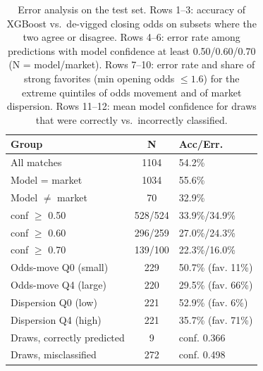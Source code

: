 \documentclass[10pt]{article}
\begin{document}
\begin{table}[htbp]
\centering
\caption{Error analysis on the test set. Rows 1--3: accuracy of XGBoost vs.\
de-vigged closing odds on subsets where the two agree or disagree. Rows 4--6:
error rate among predictions with model confidence at least 0.50/0.60/0.70
(N = model/market). Rows 7--10: error rate and share of strong favorites
(min opening odds $\le 1.6$) for the extreme quintiles of odds movement and of
market dispersion. Rows 11--12: mean model confidence for draws that were
correctly vs.\ incorrectly classified.}
\label{tab:error}
\small
\begin{tabular}{lcl}
\toprule
Group & N & Acc/Err. \\
\midrule
All matches & 1104 & 54.2\% \\
Model = market & 1034 & 55.6\% \\
Model $\ne$ market & 70 & 32.9\% \\
conf $\ge$ 0.50 & 528/524 & 33.9\%/34.9\% \\
conf $\ge$ 0.60 & 296/259 & 27.0\%/24.3\% \\
conf $\ge$ 0.70 & 139/100 & 22.3\%/16.0\% \\
Odds-move Q0 (small) & 229 & 50.7\% (fav. 11\%) \\
Odds-move Q4 (large) & 220 & 29.5\% (fav. 66\%) \\
Dispersion Q0 (low) & 221 & 52.9\% (fav. 6\%) \\
Dispersion Q4 (high) & 221 & 35.7\% (fav. 71\%) \\
Draws, correctly predicted & 9 & conf. 0.366 \\
Draws, misclassified & 272 & conf. 0.498 \\
\bottomrule
\end{tabular}
\end{table}
\end{document}
